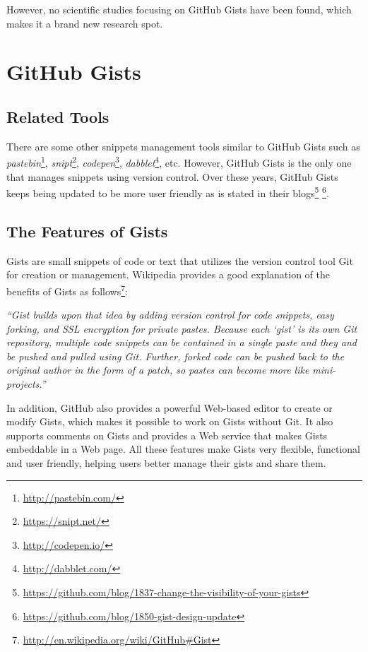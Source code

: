 However, no scientific studies focusing on GitHub Gists have been found, which makes it a brand new research spot.

\section{GitHub Gists}

\subsection{Related Tools}
There are some other snippets management tools similar to GitHub Gists such as \textit{pastebin}\footnote{\url{http://pastebin.com/}}, \textit{snipt}\footnote{\url{https://snipt.net/}}, \textit{codepen}\footnote{\url{http://codepen.io/}}, \textit{dabblet}\footnote{\url{http://dabblet.com/}}, etc. However, GitHub Gists is the only one that manages snippets using version control. Over these years, GitHub Gists keeps being updated to be more user friendly as is stated in their blogs\footnote{\url{https://github.com/blog/1837-change-the-visibility-of-your-gists}} \footnote{\url{https://github.com/blog/1850-gist-design-update}}.

\subsection{The Features of Gists}

Gists are small snippets of code or text that utilizes the version control tool Git for creation or management. Wikipedia provides a good explanation of the benefits of Gists as follows\footnote{\url{http://en.wikipedia.org/wiki/GitHub\#Gist}}: 

\textsl{``Gist builds upon that idea by adding version control for code snippets, easy forking, and SSL encryption for private pastes. Because each `gist' is its own Git repository, multiple code snippets can be contained in a single paste and they and be pushed and pulled using Git. Further, forked code can be pushed back to the original author in the form of a patch, so pastes can become more like mini-projects.''}

In addition, GitHub also provides a powerful Web-based editor to create or modify Gists, which makes it possible to work on Gists without Git. It also supports comments on Gists and provides a Web service that makes Gists embeddable in a Web page. All these features make Gists very flexible, functional and user friendly, helping users better manage their gists and share them.